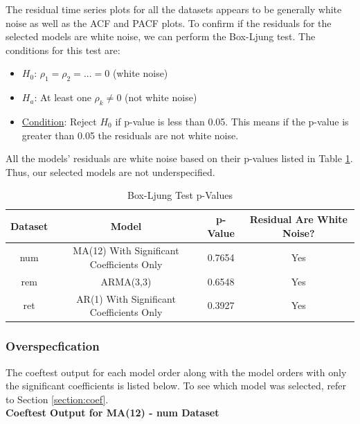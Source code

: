 \documentclass[a4paper]{article}
\begin{document}
The residual time series plots for all the datasets appears to be generally white noise as well as the ACF and PACF plots. To confirm if the residuals for the selected models are white noise, we can perform the Box-Ljung test. The conditions for this test are:

\begin{itemize}
    \item \underline{$H_0$}: $\rho_1=\rho_2=...=0$ (white noise)
    \item \underline{$H_a$}: At least one $\rho_k\neq0$ (not white noise)
    \item \underline{Condition}: Reject $H_0$ if p-value is less than 0.05. This means if the p-value is greater than 0.05 the residuals are not white noise.
\end{itemize}

All the models' residuals are white noise based on their p-values listed in Table \ref{tab:ljung}. Thus, our selected models are not underspecified.

\begin{table}[h!]
    \centering
    \caption{Box-Ljung Test p-Values}
    \begin{tabular}{|c|c|c|c|}
    \hline
    Dataset & Model & p-Value & Residual Are White Noise? \\
    \hline
    num & MA(12) With Significant Coefficients Only &  0.7654 & Yes \\ 
    \hline
    rem & ARMA(3,3) &  0.6548 & Yes \\
    \hline
    ret & AR(1) With Significant Coefficients Only & 0.3927 & Yes \\ 
    \hline
    \end{tabular}
    \label{tab:ljung}
\end{table}

\subsubsection{Overspecfication}
The coeftest output for each model order along with the model orders with only the significant coefficients is listed below. To see which model was selected, refer to Section \ref{section:coef}.\\

\textbf{Coeftest Output for MA(12) - num Dataset}
\end{document}
